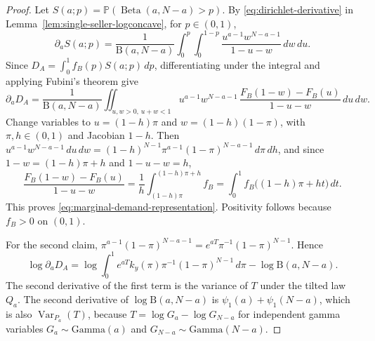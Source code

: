 \documentclass[11pt]{article}
\newcommand{\Pb}{\mathbb P}
\DeclareMathOperator{\Beta}{Beta}
\DeclareMathOperator{\Var}{Var}
\newcommand{\Bfun}{\mathrm{B}}
\theoremstyle{definition}
\begin{document}
\begin{proof}
Let $S(a;p)=\Pb(\Beta(a,N-a)>p)$. By \eqref{eq:dirichlet-derivative} in
Lemma~\ref{lem:single-seller-logconcave}, for $p\in(0,1)$,
\begin{equation*}
\partial_aS(a;p)=\frac{1}{\Bfun(a,N-a)}
\int_0^p\int_0^{1-p}
\frac{u^{a-1}w^{N-a-1}}{1-u-w}\,dw\,du.
\end{equation*}
Since $D_A=\int_0^1f_B(p)S(a;p)\,dp$, differentiating under the integral and
applying Fubini's theorem give
\begin{equation*}
\partial_aD_A=\frac{1}{\Bfun(a,N-a)}
\iint_{u,w>0,\,u+w<1}u^{a-1}w^{N-a-1}\,
\frac{F_B(1-w)-F_B(u)}{1-u-w}\,du\,dw.
\end{equation*}
Change variables to $u=(1-h)\pi$ and $w=(1-h)(1-\pi)$, with
$\pi,h\in(0,1)$ and Jacobian $1-h$. Then
$u^{a-1}w^{N-a-1}\,du\,dw=(1-h)^{N-1}\pi^{a-1}(1-\pi)^{N-a-1}\,d\pi\,dh$,
and since $1-w=(1-h)\pi+h$ and $1-u-w=h$,
\begin{equation*}
\frac{F_B(1-w)-F_B(u)}{1-u-w}
=\frac1h\int_{(1-h)\pi}^{(1-h)\pi+h}f_B
=\int_0^1f_B\bigl((1-h)\pi+ht\bigr)\,dt.
\end{equation*}
This proves \eqref{eq:marginal-demand-representation}. Positivity follows
because $f_B>0$ on $(0,1)$.

For the second claim, $\pi^{a-1}(1-\pi)^{N-a-1}=e^{aT}\pi^{-1}(1-\pi)^{N-1}$.
Hence
\begin{equation*}
\log\partial_aD_A=\log\int_0^1 e^{aT}k_y(\pi)\pi^{-1}(1-\pi)^{N-1}\,d\pi
-\log\Bfun(a,N-a).
\end{equation*}
The second derivative of the first term is the variance of $T$ under the
tilted law $Q_a$. The second derivative of $\log\Bfun(a,N-a)$ is
$\psi_1(a)+\psi_1(N-a)$, which is also $\Var_{P_a}(T)$, because
$T=\log G_a-\log G_{N-a}$ for independent gamma variables
$G_a\sim\mathrm{Gamma}(a)$ and $G_{N-a}\sim\mathrm{Gamma}(N-a)$.
\end{proof}
\end{document}
